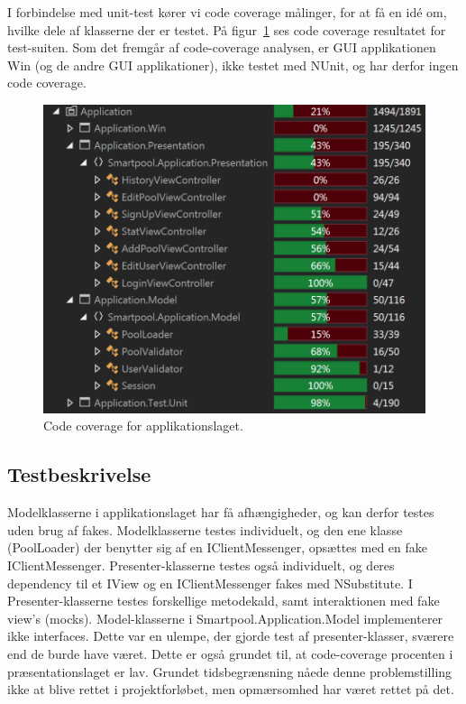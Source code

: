 I forbindelse med unit-test kører vi code coverage målinger, for at få en idé om, hvilke dele af klasserne der er testet. På figur~\ref{fig:appcoverage} ses code coverage resultatet for test-suiten. Som det fremgår af code-coverage analysen, er GUI applikationen Win (og de andre GUI applikationer), ikke testet med NUnit, og har derfor ingen code coverage.

\begin{figure}
\centering
\includegraphics[width=0.9\linewidth]{figs/test/appcoverage}
\caption{Code coverage for applikationslaget.}
\label{fig:appcoverage}
\end{figure}

\subsection{Testbeskrivelse}
Modelklasserne i applikationslaget har få afhængigheder, og kan derfor testes uden brug af fakes. Modelklasserne testes individuelt, og den ene klasse (PoolLoader) der benytter sig af en IClientMessenger, opsættes med en fake IClientMessenger. Presenter-klasserne testes også individuelt, og deres dependency til et IView og en IClientMessenger fakes med NSubstitute. I Presenter-klasserne testes forskellige metodekald, samt interaktionen med fake view’s (mocks). Model-klasserne i Smartpool.Application.Model implementerer ikke interfaces. Dette var en ulempe, der gjorde test af presenter-klasser, sværere end de burde have været. Dette er også grundet til, at code-coverage procenten i præsentationslaget er lav. Grundet tidsbegrænsning nåede denne problemstilling ikke at blive rettet i projektforløbet, men opmærsomhed har været rettet på det.

